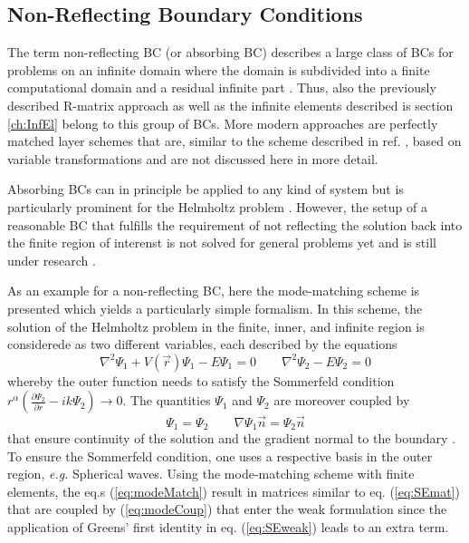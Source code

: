 \subsection{Non-Reflecting Boundary Conditions}
The term non-reflecting BC (or absorbing BC) describes a large class of BCs for problems on an infinite domain where the domain is subdivided into a finite computational domain and a residual infinite part \cite{nrBCrev}.
Thus, also the previously described R-matrix approach as well as the infinite elements described is section \ref{ch:InfEl} belong to this group of BCs.
More modern approaches are perfectly matched layer schemes \cite{pmlBook,pml1, pml2} that are, similar to the scheme described in ref. \cite{taoDVR}, based on variable transformations and are not discussed here in more detail.

Absorbing BCs can in principle be applied to any kind of system but is particularly prominent for the Helmholtz problem \cite{Engquist,HelmhPrec, nonreflectBC,nrBCrev}.
However, the setup of a reasonable BC that fulfills the requirement of not reflecting the solution back into the finite region of interenst is not solved for general problems yet and is still under research \cite{nonreflectBC,nrBCrev}.

As an example for a non-reflecting BC, here the mode-matching scheme \cite{AstleyMM} is presented which yields a particularly simple formalism.
In this scheme, the solution of the Helmholtz problem in the finite, inner, and infinite region is considerede as two different variables, each described by the equations
\begin{equation}
   \label{eq:modeMatch}
   \nabla^2\Psi_1 +V(\vec{r})\Psi_1-E\Psi_1=0 \qquad \nabla^2\Psi_2 -E\Psi_2=0 
\end{equation}
whereby the outer function needs to satisfy the Sommerfeld condition $r^\alpha \left(\frac{\partial \Psi_2}{\partial r} - ik \Psi_2  \right)\rightarrow 0$.
The quantities $\Psi_1$ and $\Psi_2$ are moreover coupled by 
\begin{equation}
\label{eq:modeCoup}
\Psi_1=\Psi_2  \qquad \nabla \Psi_1 \vec{n}=\Psi_2 \vec{n}
\end{equation}
that ensure continuity of the solution and the gradient normal to the boundary \cite{AstleyMM}.
To ensure the Sommerfeld condition, one uses a respective basis in the outer region, \textit{e.g.} Spherical waves.
Using the mode-matching scheme with finite elements, the eq.s (\ref{eq:modeMatch}) result in matrices similar to eq. (\ref{eq:SEmat}) that are coupled by (\ref{eq:modeCoup}) that enter the weak formulation since the application of Greens' first identity in eq. (\ref{eq:SEweak}) leads to an extra term.


